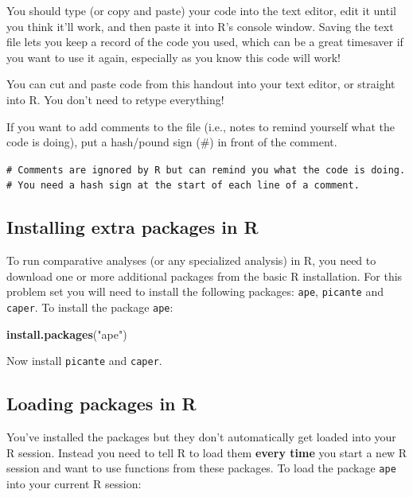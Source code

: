 \documentclass[12pt]{article}
\newcommand{\KeywordTok}[1]{\textcolor[rgb]{0.13,0.29,0.53}{\textbf{{#1}}}}
\newcommand{\StringTok}[1]{\textcolor[rgb]{0.31,0.60,0.02}{{#1}}}
\newcommand{\NormalTok}[1]{{#1}}
\begin{document}
You should type (or copy and paste) your code into the text editor, edit
it until you think it'll work, and then paste it into R's console
window. Saving the text file lets you keep a record of the code you
used, which can be a great timesaver if you want to use it again,
especially as you know this code will work!

\begin{framed}
You can cut and paste code from this handout into your text editor, or straight into R. You don't need to retype everything!
\end{framed}

If you want to add comments to the file (i.e., notes to remind yourself
what the code is doing), put a hash/pound sign (\#) in front of the
comment.

\begin{snugshade}
\texttt{\# Comments are ignored by R but can remind you what the code is doing.\\}
\texttt{\# You need a hash sign at the start of each line of a comment.}
\end{snugshade}

\subsection{Installing extra packages in R}\label{installing-packages}

To run comparative analyses (or any specialized analysis) in R, you need to 
download one or more additional packages from the basic R installation. 
For this problem set you will need to install the following packages: 
\texttt{ape}, \texttt{picante} and \texttt{caper}. 
To install the package \texttt{ape}:

\begin{snugshade}
\begin{Highlighting}[]
\KeywordTok{install.packages}\NormalTok{(}\StringTok{"ape"}\NormalTok{)}
\end{Highlighting}
\end{snugshade}

Now install \texttt{picante} and \texttt{caper}.

\subsection{Loading packages in R}

You've installed the packages but they don't automatically get loaded
into your R session. Instead you need to tell R to load them \textbf{every
time} you start a new R session and want to use functions from these
packages. To load the package \texttt{ape} into your current R session:
\end{document}
